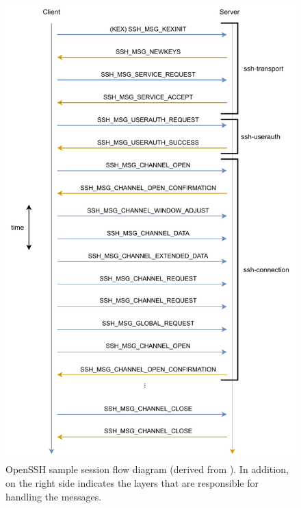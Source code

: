 \begin{figure}
    \centering
    \includegraphics{figures/ssh-flow-diagram.pdf}
    \caption[OpenSSH sample session flow diagram]{OpenSSH sample session flow diagram (derived from \cite{openssh2007}). In addition, on the right side indicates the layers that are responsible for handling the messages.}
    \label{fig:openssh-flow-diagram}
\end{figure}